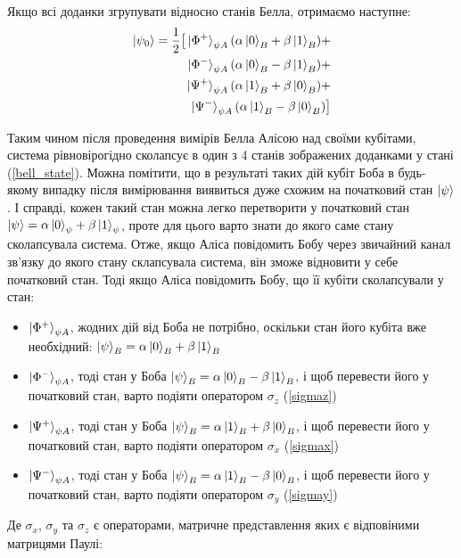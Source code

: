 \documentclass{article}
\begin{document}
Якщо всі доданки згрупувати відносно станів Белла, отримаємо наступне:
\begin{align}
\label{bell_state}
\begin{split}
    \ket{\psi_0} = \frac{1}{2}\big[
    \ket{\Phi^+}_{\psi A}(\alpha\ket{0}_B + \beta\ket{1}_B) + \\
    \ket{\Phi^-}_{\psi A}(\alpha\ket{0}_B - \beta\ket{1}_B) + \\
    \ket{\Psi^+}_{\psi A}(\alpha\ket{1}_B + \beta\ket{0}_B) + \\
    \ket{\Psi^-}_{\psi A}(\alpha\ket{1}_B - \beta\ket{0}_B)
    \big]
\end{split}
\end{align}

Таким чином після проведення вимірів Белла Алісою над своїми кубітами, система рівновірогідно сколапсує в один з 4 станів зображених доданками у стані (\ref{bell_state}).
Можна помітити, що в результаті таких дій кубіт Боба в будь-якому випадку після вимірювання виявиться дуже схожим на початковий стан $\ket{\psi}$.
І справді, кожен такий стан можна легко перетворити у початковий стан $\ket{\psi} = \alpha\ket{0}_\psi + \beta\ket{1}_\psi$, проте для цього варто знати до якого саме стану сколапсувала система.
Отже, якщо Аліса повідомить Бобу через звичайний канал зв'язку до якого стану склапсувала система, він зможе відновити у себе початковий стан. Тоді якщо Аліса повідомить Бобу, що її кубіти сколапсували у стан:

\begin{itemize}
    \item $\ket{\Phi^+}_{\psi A}$,  жодних дій від Боба не потрібно, оскільки стан його кубіта вже необхідний: $\ket{\psi}_B = \alpha\ket{0}_B + \beta\ket{1}_B$
    \item $\ket{\Phi^-}_{\psi A}$, тоді стан у Боба $\ket{\psi}_B = \alpha\ket{0}_B - \beta\ket{1}_B$, і щоб перевести його у початковий стан, варто подіяти оператором  $\sigma_z$ (\ref{sigmaz})
    \item $\ket{\Psi^+}_{\psi A}$, тоді стан у Боба $\ket{\psi}_B = \alpha\ket{1}_B + \beta\ket{0}_B$, і щоб перевести його у початковий стан, варто подіяти оператором $\sigma_x$ (\ref{sigmax})
    \item $\ket{\Psi^-}_{\psi A}$, тоді стан у Боба $\ket{\psi}_B = \alpha\ket{1}_B - \beta\ket{0}_B$, і щоб перевести його у початковий стан, варто подіяти оператором $\sigma_y$ (\ref{sigmay})
\end{itemize}

Де $\sigma_x$, $\sigma_y$ та $\sigma_z$ є операторами, матричне представлення яких є відповіними матрицями Паулі:
\end{document}
